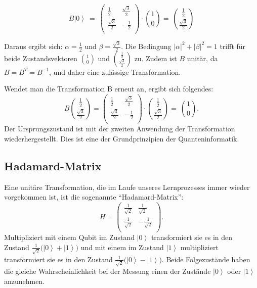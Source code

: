 \begin{equation}
    B\left|\left.0\right\rangle\ =\ \right.\left(\begin{matrix}\frac{1}{2}&\frac{\sqrt3}{2}\\\frac{\sqrt3}{2}&-\frac{1}{2}\\\end{matrix}\right)\cdot\binom{1}{0}=\ \binom{\frac{1}{2}}{\frac{\sqrt3}{2}}
\end{equation}

Daraus ergibt sich: $\alpha=\frac{1}{2}$ und $\beta=\frac{\sqrt3}{2}$. Die Bedingung $\left|\alpha\right|^2+\left|\beta\right|^2=1$ trifft für beide Zustandsvektoren $\binom{1}{0}$ und $\binom{\frac{1}{2}}{\frac{\sqrt3}{2}}$ zu. Zudem ist $B$ unitär, da $B=B^T= B^{-1}$, und daher eine zulässige Transformation.

Wendet man die Transformation B erneut an, ergibt sich folgendes:
\begin{equation}
    B\binom{\frac{1}{2}}{\frac{\sqrt3}{2}}=\left(\begin{matrix}\frac{1}{2}&\frac{\sqrt3}{2}\\\frac{\sqrt3}{2}&-\frac{1}{2}\\\end{matrix}\right)\cdot\binom{\frac{1}{2}}{\frac{\sqrt3}{2}}=\ \binom{1}{0}.
\end{equation}
Der Ursprungszustand ist mit der zweiten Anwendung der Transformation wiederhergestellt. Dies ist eine der Grundprinzipien der Quanteninformatik.

\subsection{Hadamard-Matrix}

Eine unitäre Transformation, die im Laufe unseres Lernprozesses immer wieder vorgekommen ist, ist die sogenannte ``Hadamard-Matrix'': 
\begin{equation}
    H=\left(\begin{matrix}\frac{1}{\sqrt2}&\frac{1}{\sqrt2}\\\frac{1}{\sqrt2}&-\frac{1}{\sqrt2}\\\end{matrix}\right).
\end{equation} Multipliziert mit einem Qubit im Zustand $\left|0\right\rangle$ transformiert sie es in den Zustand $\frac{1}{\sqrt2}(\left|\left.0\right\rangle+\right.\left|\left.1\right\rangle)\right.$ und mit einem im Zustand $\left|1\right\rangle$ multipliziert transformiert sie es in den Zustand $\frac{1}{\sqrt2}(\left|\left.0\right\rangle-\right.\left|\left.1\right\rangle)\right.$. Beide Folgezustände haben die gleiche Wahrscheinlichkeit bei der Messung einen der Zustände $\left|0\right\rangle$ oder $\left|1\right\rangle$ anzunehmen. \\

